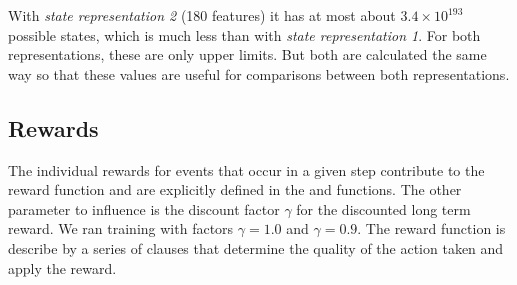 	With \textit{state representation 2} (180 features) it has at most about $3.4 \times 10^{193}$ possible states, which is much less than with \textit{state representation 1}. For both representations, these are only upper limits. But both are calculated the same way so that these values are useful for comparisons between both representations.
	
	\subsection{Rewards}
	The individual rewards for events that occur in a given step contribute to the reward function and are explicitly defined in the  and  functions. The other parameter to influence is the discount factor $\gamma$ for the discounted long term reward. We ran training with factors $\gamma = 1.0$ and $\gamma = 0.9$. The reward function is describe by a series of  clauses that determine the quality of the action taken and apply the reward.

